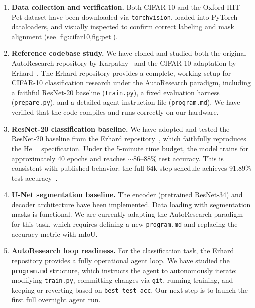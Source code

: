 \documentclass[10pt,twocolumn,letterpaper]{article}
\begin{document}
\begin{enumerate}
    \item \textbf{Data collection and verification.} Both CIFAR-10 and the Oxford-IIIT Pet dataset have been downloaded via \texttt{torchvision}, loaded into PyTorch dataloaders, and visually inspected to confirm correct labeling and mask alignment (see \cref{fig:cifar10,fig:pet}).

    \item \textbf{Reference codebase study.} We have cloned and studied both the original AutoResearch repository by Karpathy~\cite{Karpathy2025AutoResearch} and the CIFAR-10 adaptation by Erhard~\cite{Erhard2025AutoResearchCIFAR}. The Erhard repository provides a complete, working setup for CIFAR-10 classification research under the AutoResearch paradigm, including a faithful ResNet-20 baseline (\texttt{train.py}), a fixed evaluation harness (\texttt{prepare.py}), and a detailed agent instruction file (\texttt{program.md}). We have verified that the code compiles and runs correctly on our hardware.

    \item \textbf{ResNet-20 classification baseline.} We have adopted and tested the ResNet-20 baseline from the Erhard repository~\cite{Erhard2025AutoResearchCIFAR}, which faithfully reproduces the He~\etal~\cite{He2016ResNet} specification. Under the 5-minute time budget, the model trains for approximately 40 epochs and reaches $\sim$86--88\% test accuracy. This is consistent with published behavior: the full 64k-step schedule achieves 91.89\% test accuracy~\cite{Erhard2025AutoResearchCIFAR}.

    \item \textbf{U-Net segmentation baseline.} The encoder (pretrained ResNet-34) and decoder architecture have been implemented. Data loading with segmentation masks is functional. We are currently adapting the AutoResearch paradigm for this task, which requires defining a new \texttt{program.md} and replacing the accuracy metric with mIoU.

    \item \textbf{AutoResearch loop readiness.} For the classification task, the Erhard repository provides a fully operational agent loop. We have studied the \texttt{program.md} structure, which instructs the agent to autonomously iterate: modifying \texttt{train.py}, committing changes via \texttt{git}, running training, and keeping or reverting based on \texttt{best\_test\_acc}. Our next step is to launch the first full overnight agent run.
\end{enumerate}
\end{document}
